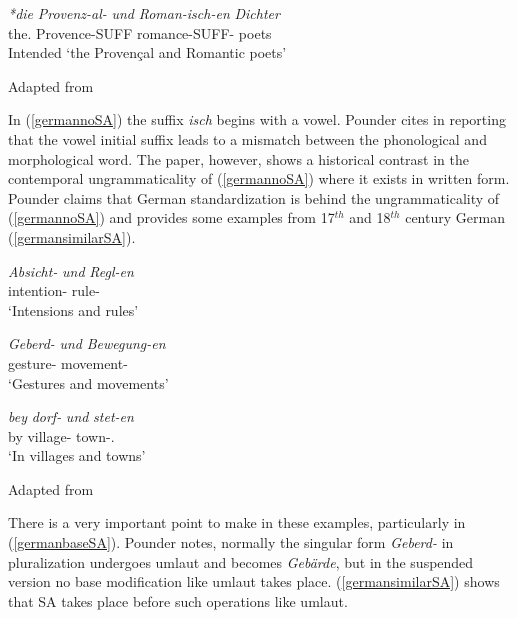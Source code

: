 \begin{exe}
    \ex \label{germannoSA}
    \gll 
    \textit{*die} \textit{Provenz-al-} \textit{und} \textit{Roman-isch-en} \textit{Dichter} \\ the.{\Pl} Provence-SUFF {\And} romance-SUFF-{\Pl} poets \\
    \glt Intended `the Provençal and Romantic poets'
    
    \hfill Adapted from \cite{pounder2006broken}
\end{exe}

In (\ref{germannoSA}) the suffix \textit{isch} begins with a vowel. Pounder cites \cite{booij1985coordination} in reporting that the vowel initial suffix leads to a mismatch between the phonological and morphological word. The paper, however, shows a historical contrast in the contemporal ungrammaticality of (\ref{germannoSA}) where it exists in written form. Pounder claims that German standardization is behind the ungrammaticality of (\ref{germannoSA}) and provides some examples from 17$^{th}$ and 18$^{th}$ century German (\ref{germansimilarSA}).

\begin{exe}
    \ex \label{germansimilarSA}
    \begin{xlist}
        \ex 
        \gll
        \textit{Absicht-} \textit{und} \textit{Regl-en} \\ intention- {\And} rule-{\Pl} \\
        \glt `Intensions and rules'
        
        \ex \label{germanbaseSA}
        \gll 
        \textit{Geberd-} \textit{und} \textit{Bewegung-en} \\ gesture- {\And} movement-{\Pl} \\
        \glt `Gestures and movements'
        
        \ex 
        \gll
        \textit{bey} \textit{dorf-} \textit{und} \textit{stet-en} \\ by village- {\And} town-{\Pl}.{\Dat} \\
        \glt `In villages and towns'
    \end{xlist}
    \hfill Adapted from \cite{pounder2006broken}
\end{exe}

There is a very important point to make in these examples, particularly in (\ref{germanbaseSA}). Pounder notes, normally the singular form \textit{Geberd-} in pluralization undergoes umlaut and becomes \textit{Geb\"{a}rde}, but in the suspended version no base modification like umlaut takes place. (\ref{germansimilarSA}) shows that SA takes place before such operations like umlaut.

